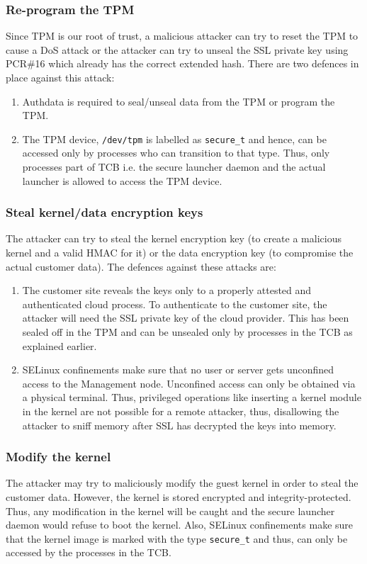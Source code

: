\documentclass[10pt,twocolumn,pdftex]{article}
\begin{document}
\subsubsection{Re-program the TPM}
Since TPM is our root of trust, a malicious attacker can try to reset the TPM to cause a DoS attack or the attacker can try to unseal the SSL private key using PCR\#16 which already has the correct extended hash. There are two defences in place against this attack:
\begin{enumerate}
\item Authdata is required to seal/unseal data from the TPM or program the TPM.
\item The TPM device, {\tt /dev/tpm} is labelled as {\tt secure\_t} and hence, can be accessed only by processes who can transition to that type. Thus, only processes part of TCB i.e. the secure launcher daemon and the actual launcher is allowed to access the TPM device.
\end{enumerate}

\subsubsection{Steal kernel/data encryption keys}
The attacker can try to steal the kernel encryption key (to create a malicious kernel and a valid HMAC for it) or the data encryption key (to compromise the actual customer data). The defences against these attacks are:
\begin{enumerate}
\item The customer site reveals the keys only to a properly attested and authenticated cloud process. To authenticate to the customer site, the attacker will need the SSL private key of the cloud provider. This has been sealed off in the TPM and can be unsealed only by processes in the TCB as explained earlier. 
\item SELinux confinements make sure that no user or server gets unconfined access to the Management node. Unconfined access can only be obtained via a physical terminal. Thus, privileged operations like inserting a kernel module in the kernel are not possible for a remote attacker, thus, disallowing the attacker to sniff memory after SSL has decrypted the keys into memory.
\end{enumerate}

\subsubsection{Modify the kernel}
The attacker may try to maliciously modify the guest kernel in order to steal the customer data. However, the kernel is stored encrypted and integrity-protected. Thus, any modification in the kernel will be caught and the secure launcher daemon would refuse to boot the kernel. Also, SELinux confinements make sure that the kernel image is marked with the type {\tt secure\_t} and thus, can only be accessed by the processes in the TCB.
\end{document}
